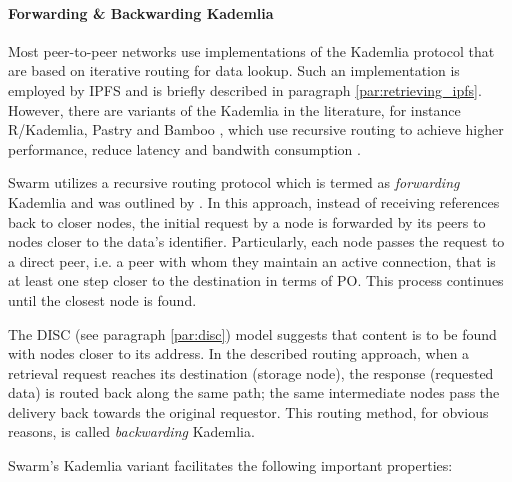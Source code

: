 \paragraph{Forwarding \& Backwarding Kademlia}\label{par:forwarding_kademlia}
Most peer-to-peer networks use implementations of the Kademlia protocol that are based on iterative routing for data lookup. Such an implementation is employed by IPFS and is briefly described in paragraph \ref{par:retrieving_ipfs}. However, there are variants of the Kademlia in the literature, for instance R/Kademlia, Pastry and Bamboo \citep{chowdhury_2017},  which use recursive routing to achieve higher performance, reduce latency and bandwith consumption \citep{heep_2010}.

Swarm utilizes a recursive routing protocol which is termed as \textit{forwarding} Kademlia and was outlined by \cite{tron_2018}. In this approach, instead of receiving references back to closer nodes, the initial request by a node is forwarded by its peers to nodes closer to the data's identifier. Particularly, each node passes the request to a direct peer, i.e. a peer with whom they maintain an active connection, that is at least one step closer to the destination in terms of PO. This process continues until the closest node is found.

The DISC (see paragraph \ref{par:disc}) model suggests that content is to be found with nodes closer to its address. In the described routing approach, when a retrieval request reaches its destination (storage node), the response (requested data) is routed back along the same path; the same intermediate nodes pass the delivery back towards the original requestor. This routing method, for obvious reasons, is called \textit{backwarding} Kademlia.

Swarm's Kademlia variant facilitates the following important properties:


